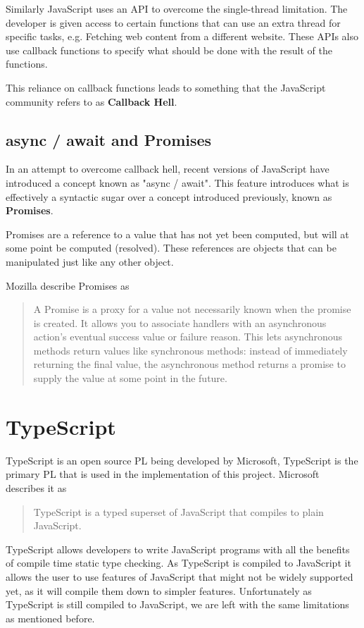 Similarly JavaScript uses an API to overcome the single-thread limitation. The developer is given access to certain functions that can use an extra thread for specific tasks, e.g. Fetching web content from a different website. These APIs also use callback functions to specify what should be done with the result of the functions.

This reliance on callback functions leads to something that the JavaScript community refers to as \textbf{Callback Hell}.

\subsection{async / await and Promises}

In an attempt to overcome callback hell, recent versions of JavaScript have introduced a concept known as "async / await".\cite{es8spec} This feature introduces what is effectively a syntactic sugar over a concept introduced previously, known as \textbf{Promises}.

Promises are a reference to a value that has not yet been computed, but will at some point be computed (resolved). These references are objects that can be manipulated just like any other object.

Mozilla describe Promises as
\begin{quote}
A Promise is a proxy for a value not necessarily known when the promise is created. It allows you to associate handlers with an asynchronous action's eventual success value or failure reason. This lets asynchronous methods return values like synchronous methods: instead of immediately returning the final value, the asynchronous method returns a promise to supply the value at some point in the future.
    \cite{mozillapromises}
\end{quote}

\section{TypeScript}
TypeScript is an open source PL being developed by Microsoft, TypeScript is the primary PL that is used in the implementation of this project. Microsoft describes it as

\begin{quote}
TypeScript is a typed superset of JavaScript that compiles to plain JavaScript.\cite{microsoftts}
\end{quote}

TypeScript allows developers to write JavaScript programs with all the benefits of compile time static type checking. As TypeScript is compiled to JavaScript it allows the user to use features of JavaScript that might not be widely supported yet, as it will compile them down to simpler features. Unfortunately as TypeScript is still compiled to JavaScript, we are left with the same limitations as mentioned before.

